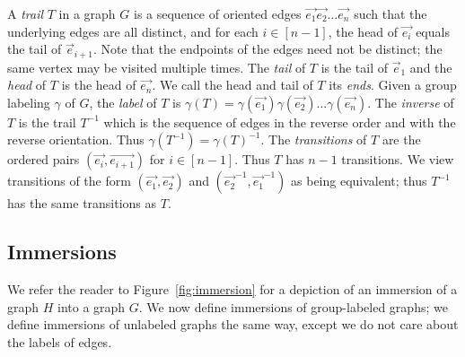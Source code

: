\documentclass[11pt]{article}
\theoremstyle{definition}
\begin{document}

A \textit{trail} $T$ in a graph $G$ is a sequence of oriented edges $\vec{e_1}\vec{e_2}\dots\vec{e_n}$ such that the underlying edges are all distinct, and for each $i \in [n-1]$, the head of $\vec{e_i}$ equals the tail of $\vec{e}_{i+1}$. Note that the endpoints of the edges need not be distinct; the same vertex may be visited multiple times. The  \textit{tail} of $T$ is the tail of $\vec{e}_1$ and the \textit{head} of $T$ is the head of $\vec{e_n}$. We call the head and tail of $T$ its \textit{ends}. Given a group labeling $\gamma$ of $G$, the \emph{label} of $T$ is $\gamma(T) = \gamma(\vec{e_1})\gamma(\vec{e_2})\ldots\gamma(\vec{e_n})$. The \emph{inverse} of $T$ is the trail $T^{-1}$ which is the sequence of edges in the reverse order and with the reverse orientation. Thus $\gamma(T^{-1})=\gamma(T)^{-1}$. The \textit{transitions} of $T$ are the ordered pairs $(\vec{e_i}, \vec{e_{i+1}})$ for $i \in [n-1]$. Thus $T$ has $n-1$ transitions. We view transitions of the form $(\vec{e_1}, \vec{e_{2}})$ and $(\vec{e_2}^{-1}, \vec{e_{1}}^{-1})$ as being equivalent; thus $T^{-1}$ has the same transitions as $T$. 




\subsection{Immersions}
\label{subsec:Immersions}

We refer the reader to Figure~\ref{fig:immersion} for a depiction of an immersion of a graph $H$ into a graph $G$. We now define immersions of group-labeled graphs; we define immersions of unlabeled graphs the same way, except we do not care about the labels of edges.
\end{document}
